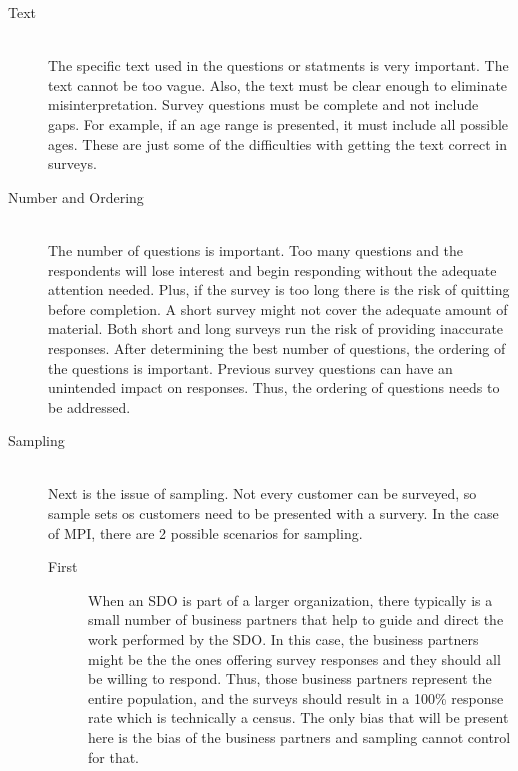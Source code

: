 \documentclass[SDSUThesis.tex]{subfiles}
\begin{document}
                \begin{description}
                \item[Text] \hfill \\
                    The specific text used in the questions or statments
                    is very important.  The text cannot be too vague.  Also, the text
                    must be clear enough to eliminate misinterpretation. Survey
                    questions must be complete and not include gaps.  For example, if
                    an age range is presented, it must include all possible ages.  These
                    are just some of the difficulties with getting the text correct
                    in surveys. 
                \item[Number and Ordering] \hfill \\
                    The number of questions is important.  Too many questions and the 
                    respondents will lose interest and begin responding without the
                    adequate attention needed.  Plus, if the survey is too long there
                    is the risk of quitting before completion.  A short survey might
                    not cover the adequate amount of material.  Both short and long
                    surveys run the risk of providing inaccurate responses.  After
                    determining the best number of questions, the ordering of the questions
                    is important.  Previous survey questions can have an unintended 
                    impact on responses.  Thus, the ordering of questions needs to be
                    addressed. 
                \item[Sampling] \hfill \\
                    Next is the issue of sampling.  Not every customer can be surveyed, so 
                    sample sets os customers need to be presented with a survery.  
                    In the case of MPI, there are 2 possible scenarios for sampling.  
                    \begin{description}
                    \item[First]
                    When an SDO is part of a larger organization, there typically is
                    a small number of business partners that help to guide and 
                    direct the work performed by the SDO.  In this case, the business 
                    partners might be the the ones offering survey responses and they 
                    should all be willing to respond.  Thus, those business partners 
                    represent the entire population, and the surveys should result in 
                    a 100\% response rate which is technically a census.  
                    The only bias that will be present here is the bias of the business 
                    partners and sampling cannot control for that.
           

\end{description}
\end{description}
\end{document}
